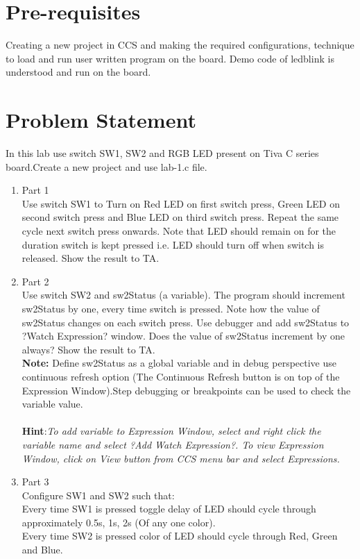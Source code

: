 \documentclass[a4paper,12pt,oneside]{book}
\begin{document}
\section{Pre-requisites}
Creating a new project in CCS and making the required configurations, technique to load and run user written program on the board. Demo code of ledblink is understood and run on the board.
\section{Problem Statement}
In this lab use switch SW1, SW2 and RGB LED present on Tiva C series board.Create a new project and use lab-1.c file.
\begin{enumerate}
\item Part 1\\
Use switch SW1 to Turn on Red LED on first switch press, Green LED on second switch
press and Blue LED on third switch press. Repeat the same cycle next switch press onwards.
Note that LED should remain on for the duration switch is kept pressed i.e. LED should turn
off when switch is released. Show the result to TA.
\item Part 2\\
Use switch SW2 and sw2Status (a variable). The program should increment sw2Status by
one, every time switch is pressed. Note how the value of sw2Status changes on each switch press.
Use debugger and add sw2Status to ?Watch Expression? window. Does the value of
sw2Status increment by one always?  Show the result to TA.
\\\textbf{Note:} Define sw2Status as a global variable and in debug perspective use continuous refresh option
(The Continuous Refresh button is on top of the Expression Window).Step debugging
or breakpoints can be used to check the variable value.
\\
\\
\textbf{Hint}:\textit{To add variable to Expression Window, select and right click the variable name and select ?Add
Watch Expression?. To view Expression Window, click on View button from CCS menu bar and
select Expressions.}
\item Part 3\\
Configure SW1 and SW2 such that:
\\
\hspace{2mm}Every time SW1 is pressed toggle delay of LED should cycle through
approximately 0.5s, 1s, 2s (Of any one color).
\\
\hspace{2mm}Every time SW2 is pressed color of LED should cycle through Red, Green
and Blue.
\end{enumerate}
 
\end{document}
